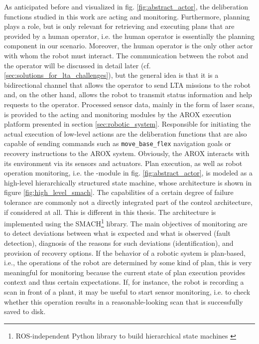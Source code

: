 \documentclass[english, master, utf8]{base/thesis_KBS}
\newcommand{\code}[1]{\colorbox{light-gray}{\texttt{#1}}}
\begin{document}
\noindent
As anticipated before and visualized in fig. \ref{fig:abstract_actor}, the deliberation functions studied in this work are acting and monitoring. Furthermore, planning plays a role,
but is only relevant for retrieving and executing plans that are provided by a human operator, i.e. the human operator is essentially the planning component in our scenario.
Moreover, the human operator is the only other actor with whom the robot must interact. The communication between the robot and the operator will be discussed in detail later (cf.
\ref{sec:solutions_for_lta_challenges}), but the general idea is that it is a bidirectional channel that allows the operator to send LTA missions to the robot and, on the
other hand, allows the robot to transmit status information and help requests to the operator. Processed sensor data, mainly in the form of laser scans, is provided to the
acting and monitoring modules by the AROX execution platform presented in section \ref{sec:robotic_system}. Responsible for initiating the actual execution of low-level actions
are the deliberation functions that are also capable of sending commands such as \code{move\_base\_flex} navigation goals or recovery instructions to the AROX system.
Obviously, the AROX interacts with its environment via its sensors and actuators.\newline
Plan execution, as well as robot operation monitoring, i.e. the -module in fig. \ref{fig:abstract_actor}, is modeled as a high-level hierarchically
structured state machine, whose architecture is shown in figure \ref{fig:high_level_smach}. The capabilities of a certain degree of failure tolerance are commonly not a directly
integrated part of the control architecture, if considered at all. \cite{Khalastchi:2018} This is different in this thesis.
The architecture is implemented using the SMACH\footnote{ROS-independent Python
library to build hierarchical state machines \cite{smach}} library. The main objectives of monitoring are to detect deviations between what is expected and what is observed
(fault detection), diagnosis of the reasons for such deviations (identification), and provision of recovery options. \cite{Ingrand:2017}
If the behavior of a robotic system is plan-based, i.e., the operations of the robot are determined by some kind of plan, this is very meaningful for monitoring because the current
state of plan execution provides context and thus certain expectations. \cite{Khalastchi:2018} If, for instance, the robot is recording a scan in front of a plant, it may be useful
to start sensor monitoring, i.e. to check whether this operation results in a reasonable-looking scan that is successfully saved to disk.
\end{document}
